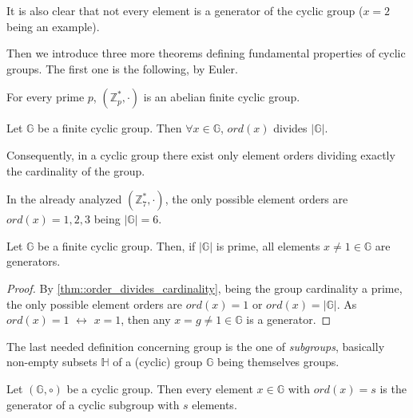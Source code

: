 \begin{myrem}
    It is also clear that not every element is a generator of the cyclic group ($x=2$ being an example).
\end{myrem}
\noindent
Then we introduce three more theorems defining fundamental properties of cyclic groups. The first one is the following, by Euler.
\begin{mytheorem}
    For every prime $p$, $(\mathbb{Z}_p^{*},\cdot)$ is an abelian finite cyclic group.
\end{mytheorem}
\begin{mytheorem}
\label{thm::order_divides_cardinality}
    Let $\mathbb{G}$ be a finite cyclic group. Then $\forall x \in \mathbb{G}$, $ord(x)$ divides $|\mathbb{G}|$.
\end{mytheorem}
\noindent
Consequently, in a cyclic group there exist only element orders dividing exactly the cardinality of the group. 
\begin{myrem}
    In the already analyzed $(\mathbb{Z}_7^{*},\cdot)$, the only possible element orders are $ord(x)=1,2,3$ being $|\mathbb{G}| = 6$.
\end{myrem}
\begin{mytheorem}
\label{thm::prime_order_all_gen}
    Let $\mathbb{G}$ be a finite cyclic group. Then, if $|\mathbb{G}|$ is prime, all elements $x \neq 1 \in \mathbb{G}$ are generators.
\end{mytheorem}
\begin{proof}
    By \ref{thm::order_divides_cardinality}, being the group cardinality a prime, the only possible element orders are $ord(x)=1$ or $ord(x)=|\mathbb{G}|$. As $ord(x)=1$ $\longleftrightarrow$ $x=1$, then any $x=g \neq 1 \in \mathbb{G}$ is a generator.
\end{proof}
\noindent
The last needed definition concerning group is the one of \textit{subgroups}, basically non-empty subsets $\mathbb{H}$ of a (cyclic) group $\mathbb{G}$ being themselves groups.
\begin{mytheorem}
    Let $(\mathbb{G},\circ)$ be a cyclic group. Then every element $x \in \mathbb{G}$ with $ord(x)=s$ is the generator of a cyclic subgroup with $s$ elements.
\end{mytheorem}
